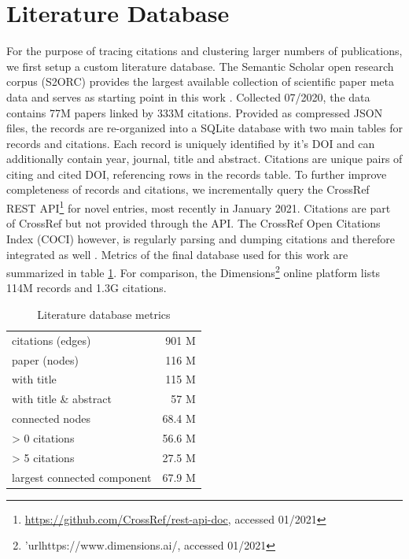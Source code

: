 \section{Literature Database}
\label{sec:state_of_art:database}

For the purpose of tracing citations and clustering larger numbers of publications, we first setup a custom literature database.
The Semantic Scholar open research corpus (S2ORC) provides the largest available collection of scientific paper meta data and serves as starting point in this work \cite{Lo2020}.
Collected 07/2020, the data contains 77M papers linked by 333M citations.
Provided as compressed JSON files, the records are re-organized into a SQLite database with two main tables for records and citations.
Each record is uniquely identified by it's DOI and can additionally contain year, journal, title and abstract.
Citations are unique pairs of citing and cited DOI, referencing rows in the records table.
To further improve completeness of records and citations, we incrementally query the CrossRef REST API\footnote{\url{https://github.com/CrossRef/rest-api-doc}, accessed 01/2021} for novel entries, most recently in January 2021.
Citations are part of CrossRef but not provided through the API.
The CrossRef Open Citations Index (COCI) however, is regularly parsing and dumping citations and therefore integrated as well \cite{Peroni2020}.
Metrics of the final database used for this work are summarized in table \ref{tab:state_of_art:graph}. 
For comparison, the Dimensions\footnote{'url{https://www.dimensions.ai/}, accessed 01/2021} online platform lists 114M records and 1.3G citations.

\begin{table}[ht]
	\centering
	\caption[Literature Graph Metrics]{Literature database metrics}
	\label{tab:state_of_art:graph}
	\begin{tabular}{l|r}
		\hline
		citations (edges)           & 901 M 	\\
		paper (nodes)               & 116 M 	\\ \hline
		with title					& 115 M		\\
		with title \& abstract		&  57 M		\\ \hline
		connected nodes             &  68.4 M 	\\
		> 0 citations				&  56.6 M	\\
		> 5 citations				&  27.5 M	\\
		largest connected component &  67.9 M 	\\ \hline
	\end{tabular}
\end{table}

